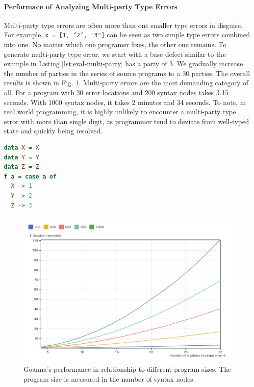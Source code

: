\documentclass[pdflatex,sn-mathphys-num]{sn-jnl}%
\begin{document}
   \paragraph{\textbf{Performace of Analyzing Multi-party Type Errors}}
    Multi-party type errors are often more than one smaller type errors in disguise. For example, \texttt{x = [1, '2', "3"]} can be seen as two simple type errors combined into one. No matter which one programer fixes, the other one remains. To generate multi-party type error, we start with a base defect similar to the example in Listing \ref{lst:eval-multi-party} has a party of 3. We gradually increase the number of parties in the series of source programs to a 30 parties. The overall results is shown in Fig. \ref{fig:multi-party-time}. Multi-party errors are the most demanding category of all. For a program with 30 error locations and 200 syntax nodes takes 3.15 seconds. With 1000 syntax nodes, it takes 2 minutes and 34 seconds. To note, in real world programming, it is highly unlikely to encounter a multi-party type error with more than single digit, as programmer tend to deviate from well-typed state and quickly being resolved. 

\begin{lstlisting}[language=Haskell, caption=Multi-Party Hakslel Example, label={lst:eval-multi-party}]
data X = X
data Y = Y
data Z = Z
f a = case a of 
  X -> 1
  Y -> 2
  Z -> 3
\end{lstlisting}

 \begin{figure}[ht]
        \centering
        \includegraphics[width=0.8\linewidth]{images/multi-party-time.png}
        \caption{Goanna's performance in relationship to different program sizes. The program size is measured in the number of syntax nodes.}
        \label{fig:multi-party-time}
    \end{figure}
\end{document}
